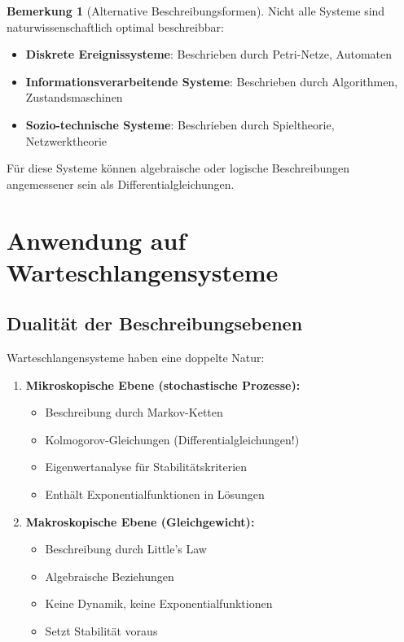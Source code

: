 ﻿\documentclass[a4paper,12pt]{report}
\theoremstyle{definition}
\newtheorem{bemerkung}{Bemerkung}[section]
\begin{document}
\begin{bemerkung}[Alternative Beschreibungsformen]
	Nicht alle Systeme sind naturwissenschaftlich optimal beschreibbar:
	\begin{itemize}
		\item[-] \textbf{Diskrete Ereignissysteme}: Beschrieben durch Petri-Netze, Automaten
		\item[-] \textbf{Informationsverarbeitende Systeme}: Beschrieben durch Algorithmen, Zustandsmaschinen
		\item[-] \textbf{Sozio-technische Systeme}: Beschrieben durch Spieltheorie, Netzwerktheorie
	\end{itemize}
	
	Für diese Systeme können algebraische oder logische Beschreibungen angemessener sein als Differentialgleichungen.
\end{bemerkung}

\section{Anwendung auf Warteschlangensysteme}

\subsection{Dualität der Beschreibungsebenen}

Warteschlangensysteme haben eine doppelte Natur:

\begin{enumerate}
	\item[-] \textbf{Mikroskopische Ebene (stochastische Prozesse):}
	\begin{itemize}
		\item[-] Beschreibung durch Markov-Ketten
		\item[-] Kolmogorov-Gleichungen (Differentialgleichungen!)
		\item[-] Eigenwertanalyse für Stabilitätskriterien
		\item[-] Enthält Exponentialfunktionen in Lösungen
	\end{itemize}
	
	\item[-] \textbf{Makroskopische Ebene (Gleichgewicht):}
	\begin{itemize}
		\item[-] Beschreibung durch Little's Law
		\item[-] Algebraische Beziehungen
		\item[-] Keine Dynamik, keine Exponentialfunktionen
		\item[-] Setzt Stabilität voraus
	\end{itemize}
\end{enumerate}
\end{document}
